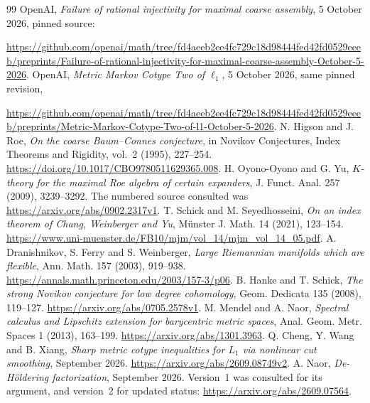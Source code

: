 \documentclass[11pt]{article}
\theoremstyle{remark}\newtheorem{remark}[theorem]{Remark}
\begin{document}
\begin{thebibliography}{99}\small
{} OpenAI, \emph{Failure of rational injectivity for maximal
coarse assembly}, 5 October 2026, pinned source:\par
\url{https://github.com/openai/math/tree/fd4aeeb2ee4fc729c18d98444fed42fd0529eeeb/preprints/Failure-of-rational-injectivity-for-maximal-coarse-assembly-October-5-2026}.
 OpenAI, \emph{Metric Markov Cotype Two of $\ell_1$},
5 October 2026, same pinned revision,\par
\url{https://github.com/openai/math/tree/fd4aeeb2ee4fc729c18d98444fed42fd0529eeeb/preprints/Metric-Markov-Cotype-Two-of-l1-October-5-2026}.
 N. Higson and J. Roe, \emph{On the coarse Baum--Connes
conjecture}, in Novikov Conjectures, Index Theorems and Rigidity, vol.~2
(1995), 227--254. \url{https://doi.org/10.1017/CBO9780511629365.008}.
 H. Oyono-Oyono and G. Yu, \emph{$K$-theory for the maximal
Roe algebra of certain expanders}, J. Funct. Anal. 257 (2009), 3239--3292.
The numbered source consulted was \url{https://arxiv.org/abs/0902.2317v1}.
 T. Schick and M. Seyedhosseini, \emph{On an index theorem of
Chang, Weinberger and Yu}, M\"unster J. Math. 14 (2021), 123--154.
\url{https://www.uni-muenster.de/FB10/mjm/vol_14/mjm_vol_14_05.pdf}.
 A. Dranishnikov, S. Ferry and S. Weinberger, \emph{Large
Riemannian manifolds which are flexible}, Ann. Math. 157 (2003), 919--938.
\url{https://annals.math.princeton.edu/2003/157-3/p06}.
 B. Hanke and T. Schick, \emph{The strong Novikov conjecture
for low degree cohomology}, Geom. Dedicata 135 (2008), 119--127.
\url{https://arxiv.org/abs/0705.2578v1}.
 M. Mendel and A. Naor, \emph{Spectral calculus and Lipschitz
extension for barycentric metric spaces}, Anal. Geom. Metr. Spaces 1 (2013),
163--199. \url{https://arxiv.org/abs/1301.3963}.
 Q. Cheng, Y. Wang and B. Xiang, \emph{Sharp metric cotype
inequalities for $L_1$ via nonlinear cut smoothing}, September 2026.
\url{https://arxiv.org/abs/2609.08749v2}.
 A. Naor, \emph{De-H\"oldering factorization}, September 2026.
Version~1 was consulted for its argument, and version~2 for updated status:
\url{https://arxiv.org/abs/2609.07564}.
\end{thebibliography}
\end{document}
